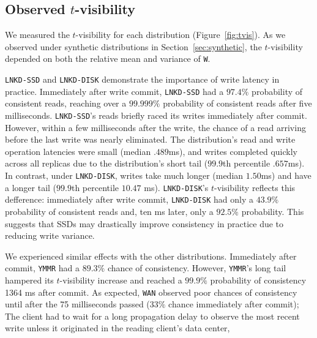 \documentclass{vldb}
\newcommand{\subsectionskip}{-0em}
\begin{document}
\vspace{\subsectionskip}\subsection{Observed {\large$t$}-visibility}

We measured the $t$-visibility for each distribution
(Figure~\ref{fig:tvis}). As we observed under synthetic distributions
in Section~\ref{sec:synthetic}, the $t$-visibility depended on both
the relative mean and variance of \texttt{W}.

\texttt{LNKD-SSD} and \texttt{LNKD-DISK} demonstrate the importance of
write latency in practice.  Immediately after write commit,
\texttt{LNKD-SSD} had a $97.4\%$ probability of consistent reads,
reaching over a $99.999\%$ probability of consistent reads after five
milliseconds. \texttt{LNKD-SSD}'s reads briefly raced its writes
immediately after commit.  However, within a few milliseconds after
the write, the chance of a read arriving before the last write was
nearly eliminated. The distribution's read and write
operation latencies were small (median $.489$ms), and writes
completed quickly across all replicas due to the distribution's short
tail ($99.9$th percentile $.657$ms).  In contrast, under
\texttt{LNKD-DISK}, writes take much longer (median $1.50$ms)
and have a longer tail ($99.9$th percentile $10.47$ ms).
\texttt{LNKD-DISK}'s $t$-visibility reflects this defference:
immediately after write commit, \texttt{LNKD-DISK} had only a $43.9\%$
probability of consistent reads and, ten ms later, only a $92.5\%$
probability.  This suggests that SSDs may drastically
improve consistency in practice due to reducing write variance.

We experienced similar effects with the other distributions.
Immediately after commit, \texttt{YMMR} had a $89.3\%$ chance of
consistency.  However, \texttt{YMMR}'s long tail hampered its
$t$-visibility increase and reached a $99.9\%$ probability of
consistency 1364 ms after commit.  As expected, \texttt{WAN} observed
poor chances of consistency until after the 75 milliseconds passed
($33\%$ chance immediately after commit); The client had to wait for a
long propagation delay to observe the most recent write unless it
originated in the reading client's data center,
\end{document}
